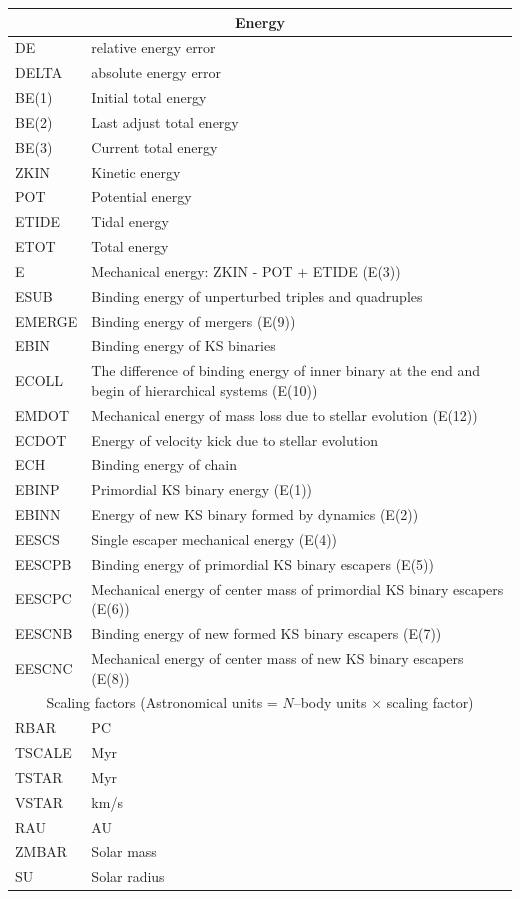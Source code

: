 \begin{longtable}{|p{0.7in}|p{4.3in}|}
    \multicolumn{2}{|c|}{ Energy } \\\hline 
    DE    & relative energy error \\\hline
    DELTA & absolute energy error \\\hline
    BE(1) & Initial total energy  \\\hline
    BE(2) & Last adjust total energy  \\\hline
    BE(3) & Current total energy  \\\hline
    ZKIN   & Kinetic energy \\\hline
    POT    & Potential energy \\\hline
    ETIDE  & Tidal energy \\\hline
    ETOT   & Total energy \\\hline
    E      & Mechanical energy: ZKIN - POT + ETIDE (E(3)) \\\hline
    ESUB   & Binding energy of unperturbed triples and quadruples \\\hline  
    EMERGE & Binding energy of mergers (E(9))\\\hline
    EBIN   & Binding energy of KS binaries \\\hline
    ECOLL  & The difference of binding energy of inner binary at the end and begin of hierarchical systems (E(10))\\\hline
    EMDOT  & Mechanical energy of mass loss due to stellar evolution (E(12))\\\hline
    ECDOT  & Energy of velocity kick due to stellar evolution\\\hline
    ECH    & Binding energy of chain \\\hline
    EBINP  & Primordial KS binary energy (E(1))\\\hline
    EBINN  & Energy of new KS binary formed by dynamics (E(2))\\\hline
    EESCS  & Single escaper mechanical energy (E(4))\\\hline
    EESCPB & Binding energy of primordial KS binary escapers (E(5))\\\hline
    EESCPC & Mechanical energy of center mass of primordial KS binary escapers (E(6))\\\hline
    EESCNB & Binding energy of new formed KS binary escapers (E(7))\\\hline
    EESCNC & Mechanical energy of center mass of new KS binary escapers (E(8))\\\hline

    \multicolumn{2}{|c|}{ Scaling factors (Astronomical units = $N$--body units $\times$ scaling factor)} \\\hline 
    RBAR  & PC \\\hline
    TSCALE& Myr \\\hline
    TSTAR & Myr \\\hline
    VSTAR & km/s \\\hline
    RAU   & AU \\\hline
    ZMBAR & Solar mass \\\hline
    SU    & Solar radius \\\hline
    \hline


\end{longtable}
